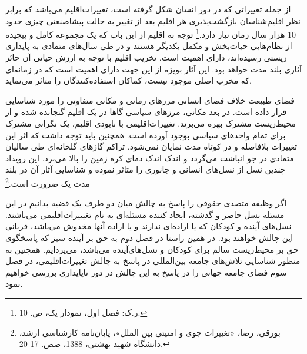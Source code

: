 از جمله تغییراتی که در دور انسان شکل گرفته است، تغییرات‌اقلیم می‌باشد که برابر نظر اقلیم‌شناسان بازگشت‌پذیری هر اقلیم بعد از تغییر به حالت پیشاصنعتی  چیزی حدود 10 هزار سال زمان نیاز دارد.\footnote{ر.ک: فصل اول، نمودار یک، ص. 10. } توجه به اقلیم از این باب که یک مجموعه کامل و پیچیده از نظام‌هایی حیات‌بخش و مکمل یکدیگر هستند و در طی سال‌های متمادی به پایداری زیستی رسیده‌اند، دارای اهمیت است. تخریب اقلیم با توجه به ارزش حیاتی آن حائز آثاری بلند مدت خواهد بود. این آثار بویژه از این جهت دارای اهمیت است که در زمانه‌ای که مخرب اصلی موجود نیست، کماکان استفاده‌کنندگان را متاثر می‌نماید. 

فضای طبیعت خلاف فضای انسانی مرز‌های زمانی و مکانی متفاوتی را مورد شناسایی قرار داده است. در بعد مکانی، مرز‌های سیاسی گاها در یک اقلیم گنجانده شده و از محیط‌زیست مشترک بهره می‌برند. تغییرات‌اقلیمی با نابودی اقلیم، یک نگرانی مشترک برای تمام واحد‌های سیاسی بوجود آورده است. همچنین باید توجه داشت که اثر این تغییرات بلافاصله و در کوتاه مدت نمایان نمی‌شود. تراکم گاز‌های گلخانه‌ای طی سالیان متمادی در جو انباشت می‌گردد و اندک اندک دمای کره زمین را بالا می‌برد. این رویداد چندین نسل از نسل‌های انسانی و جانوری را متاثر نموده و شناسایی آثار آن در بلند مدت یک ضرورت است.\footnote{بورقی، رضا، «تغییرات جوی و امنیتی بین‌ الملل»، پایان‌نامه کارشناسی ارشد، دانشگاه شهید بهشتی، 1388، صص. 17-20.}

اگر وظیفه متصدی حقوقی را پاسخ به چالش میان دو طرف یک قضیه بدانیم در این مسئله نسل حاضر و گذشته، ایجاد کننده مسئله‌ای به نام تغیییرات‌اقلیمی می‌باشند. نسل‌های آینده و کودکان  که یا اراده‌ای ندارند و یا اراده آنها مخدوش می‌باشد، قربانی این چالش خواهند بود. در همین راستا در فصل دوم به حق بر آینده سبز که پاسخگوی حق بر محیط‌زیست سالم برای کودکان و نسل‌های‌آینده می‌باشد، می‌پردایم. همچنین به منظور شناسایی تلاش‌های جامعه بین‌المللی در پاسخ به چالش تغییرات‌اقلیمی، در فصل سوم فضای جامعه جهانی را در پاسخ به این چالش در دور ناپایداری بررسی خواهیم نمود. 

 